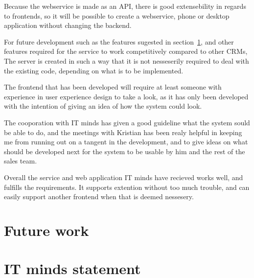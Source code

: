 Because the webservice is made as an API, there is good extensebility in regards
to frontends, so it will be possible to create a webservice, phone or desktop
application without changing the backend.

For future development such as the features sugested in
section~\ref{sec:future_work}, and other features required for the service to
work competitively compared to other CRMs, The server is created in such a way
that it is not nesseserily required to deal with the existing code, depending on
what is to be implemented.

The frontend that has been developed will require at least someone with
experience in user experience design to take a look, as it has only been
developed with the intention of giving an idea of how the system could look.

The cooporation with IT minds has given a good guideline what the system sould
be able to do, and the meetings with Kristian has been realy helpful in keeping
me from running out on a tangent in the development, and to give ideas on what
should be developed next for the system to be usable by him and the rest of the
sales team.

Overall the service and web application IT minds have recieved works well, and
fulfills the requirements. It supports extention without too much trouble, and
can easily support another frontend when that is deemed nessesery.

\section{Future work}
\label{sec:future_work}
  
\section{IT minds statement}
